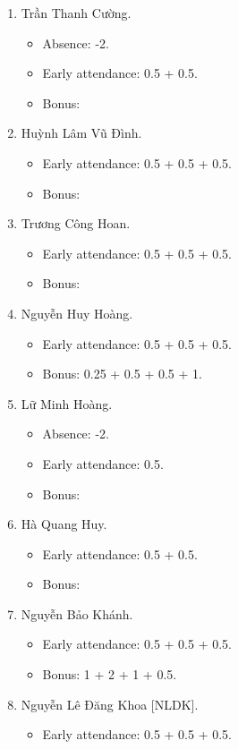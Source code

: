 \documentclass{article}
\begin{document}
\begin{enumerate}
	\item {\sc Trần Thanh Cường.}
	\begin{itemize}
		\item Absence: -2.
		\item Early attendance: 0.5 + 0.5.
		\item Bonus: 
	\end{itemize}
	\item {\sc Huỳnh Lâm Vũ Đình.}
	\begin{itemize}
		\item Early attendance: 0.5 + 0.5 + 0.5.
		\item Bonus: 
	\end{itemize}
	\item {\sc Trương Công Hoan.}
	\begin{itemize}
		\item Early attendance: 0.5 + 0.5 + 0.5.
		\item Bonus: 
	\end{itemize}
	\item {\sc Nguyễn Huy Hoàng.}
	\begin{itemize}
		\item Early attendance: 0.5 + 0.5 + 0.5.
		\item Bonus: 0.25 + 0.5 + 0.5 + 1.
	\end{itemize}
	\item {\sc Lữ Minh Hoàng.}
	\begin{itemize}
		\item Absence: -2.
		\item Early attendance: 0.5.
		\item Bonus: 
	\end{itemize}
	\item {\sc Hà Quang Huy.}
	\begin{itemize}
		\item Early attendance: 0.5 + 0.5.
		\item Bonus: 
	\end{itemize}
	\item {\sc Nguyễn Bảo Khánh.}
	\begin{itemize}
		\item Early attendance: 0.5 + 0.5 + 0.5.
		\item Bonus: 1 + 2 + 1 + 0.5.
	\end{itemize}
	\item {\sc Nguyễn Lê Đăng Khoa [NLDK].}
	\begin{itemize}
		\item Early attendance: 0.5 + 0.5 + 0.5.

\end{itemize}
\end{enumerate}
\end{document}
